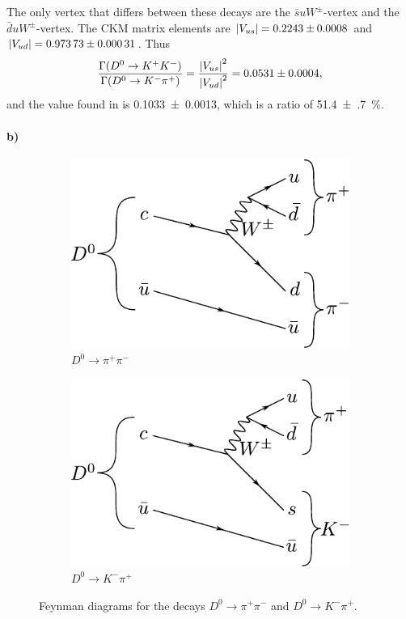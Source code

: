 The only vertex that differs between these decays are the $\bar{s} u W^\pm$-vertex and the $\bar{d} u W^\pm $-vertex. The CKM matrix elements are $\abs{V_{us}} = \num{0.2243(8)}$ and $\abs{V_{ud}} = \num{0.97373(31)}$. Thus
\begin{equation}
	\frac{\Gamma(D^0 \to K^+ K^-)}{\Gamma(D^0 \to K^- \pi^+)} = \frac{\abs{V_{us}}^2}{\abs{V_{ud}}^2} = \num{0.0531(4)},
\end{equation}
and the value found in \cite{particles} is \num{0.1033(13)}, which is a ratio of \SI{51.4(7)}{\percent}.

\paragraph{b)}
\begin{figure}[H]
	\centering
	\begin{subfigure}{0.49\textwidth}
		\includegraphics[width=\textwidth]{figures/D0_pi+pi-.pdf}
		\caption{$D^0 \to \pi^+ \pi^-$}
	\end{subfigure}
	\hfill
	\begin{subfigure}{0.49\textwidth}
		\includegraphics[width=\textwidth]{figures/D0_K-pi+.pdf}
		\caption{$D^0 \to K^- \pi^+$}
	\end{subfigure}
	\caption{Feynman diagrams for the decays $D^0 \to \pi^+ \pi^-$ and $D^0 \to K^- \pi^+$.}
\end{figure}
